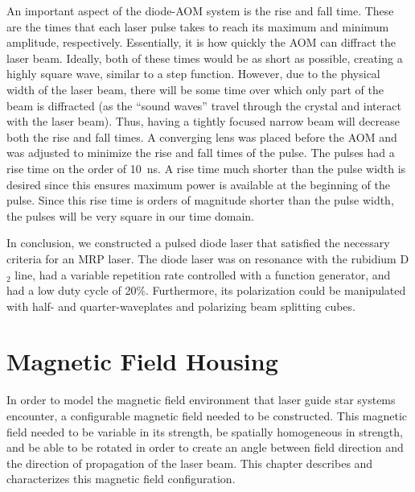 
An important aspect of the diode-AOM system is the rise and fall time. These are the times that each laser pulse takes to reach its maximum and minimum amplitude, respectively. Essentially, it is how quickly the AOM can diffract the laser beam. Ideally, both of these times would be as short as possible, creating a highly square wave, similar to a step function. However, due to the physical width of the laser beam, there will be some time over which only part of the beam is diffracted (as the ``sound waves'' travel through the crystal and interact with the laser beam). Thus, having a tightly focused narrow beam will decrease both the rise and fall times. A converging lens was placed before the AOM and was adjusted to minimize the rise and fall times of the pulse. The pulses had a rise time on the order of \SI{10}{\nano \second}. A rise time much shorter than the pulse width is desired since this ensures maximum power is available at the beginning of the pulse. Since this rise time is orders of magnitude shorter than the pulse width, the pulses will be very square in our time domain.

In conclusion, we constructed a pulsed diode laser that satisfied the necessary criteria for an MRP laser. The diode laser was on resonance with the rubidium D$_2$ line, had a variable repetition rate controlled with a function generator, and had a low duty cycle of 20\%. Furthermore, its polarization could be manipulated with half- and quarter-waveplates and polarizing beam splitting cubes.

\chapter{Magnetic Field Housing}


In order to model the magnetic field environment that laser guide star systems encounter, a configurable magnetic field needed to be constructed. This magnetic field needed to be variable in its strength, be spatially homogeneous in strength, and be able to be rotated in order to create an angle between field direction and the direction of propagation of the laser beam. This chapter describes and characterizes this magnetic field configuration.

